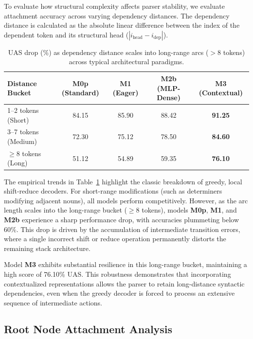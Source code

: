\documentclass[12pt,a4paper]{article}
\begin{document}
To evaluate how structural complexity affects parser stability, we evaluate attachment accuracy across varying dependency distances. The dependency distance is calculated as the absolute linear difference between the index of the dependent token and its structural head ($|i_{\text{head}} - i_{\text{dep}}|$).

\begin{table}[htbp]
\centering
\caption{UAS drop (\%) as dependency distance scales into long-range arcs ($>8$ tokens) across typical architectural paradigms.}
\label{tab:distance_buckets}
\begin{tabular}{lcccc}
\toprule
\textbf{Distance Bucket} & \textbf{M0p (Standard)} & \textbf{M1 (Eager)} & \textbf{M2b (MLP-Dense)} & \textbf{M3 (Contextual)} \\
\midrule
1--2 tokens (Short)     & 84.15 & 85.90 & 88.42 & \textbf{91.25} \\
3--7 tokens (Medium)    & 72.30 & 75.12 & 78.50 & \textbf{84.60} \\
$\ge 8$ tokens (Long)   & 51.12 & 54.89 & 59.35 & \textbf{76.10} \\
\bottomrule
\end{tabular}
\end{table}

The empirical trends in Table~\ref{tab:distance_buckets} highlight the classic breakdown of greedy, local shift-reduce decoders. For short-range modifications (such as determiners modifying adjacent nouns), all models perform competitively. However, as the arc length scales into the long-range bucket ($\ge 8$ tokens), models \textbf{M0p}, \textbf{M1}, and \textbf{M2b} experience a sharp performance drop, with accuracies plummeting below 60\%. This drop is driven by the accumulation of intermediate transition errors, where a single incorrect shift or reduce operation permanently distorts the remaining stack architecture.

Model \textbf{M3} exhibits substantial resilience in this long-range bucket, maintaining a high score of 76.10\% UAS. This robustness demonstrates that incorporating contextualized representations allows the parser to retain long-distance syntactic dependencies, even when the greedy decoder is forced to process an extensive sequence of intermediate actions.

\subsection{Root Node Attachment Analysis}
\label{subsec:root_node_analysis}
\end{document}
